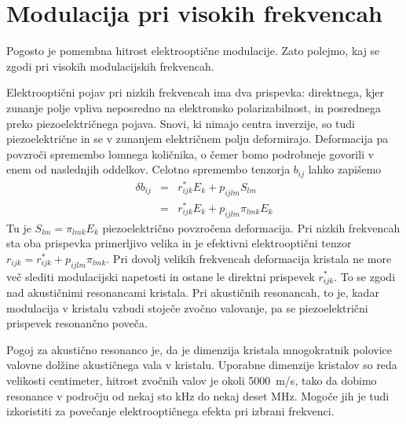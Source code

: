 \section{Modulacija pri visokih frekvencah}

Pogosto je pomembna hitrost elektrooptične modulacije. Zato polejmo,
kaj se zgodi pri visokih modulacijskih frekvencah.

Elektrooptični pojav pri nizkih frekvencah ima dva prispevka: direktnega,
kjer zunanje polje vpliva neposredno na elektronsko polarizabilnost,
in posrednega preko piezoelektričnega pojava. Snovi, ki nimajo centra
inverzije, so tudi piezoelektrične in se v zunanjem električnem polju
deformirajo. Deformacija pa povzroči spremembo lomnega količnika,
o čemer bomo podrobneje govorili v enem od naslednjih oddelkov. Celotno
spremembo tenzorja $b_{ij}$ lahko zapišemo 
\begin{eqnarray}
\delta b_{ij} & = & r_{ijk}^{\ast}E_{k}+p_{ijlm}S_{lm}\nonumber \\
 & = & r_{ijk}^{\ast}E_{k}+p_{ijlm}\pi_{lmk}E_{k}
\end{eqnarray}
 Tu je $S_{lm}=\pi_{lmk}E_{k}$ piezoelektrično povzročena deformacija.
Pri nizkih frekvencah sta oba prispevka primerljivo velika in je efektivni
elektrooptični tenzor $r_{ijk}=r_{ijk}^{\ast}+p_{ijlm}\pi_{lmk}$.
Pri dovolj velikih frekvencah deformacija kristala ne more več slediti
modulacijski napetosti in ostane le direktni prispevek $r_{ijk}^{\ast}$.
To se zgodi nad akustičnimi resonancami kristala. Pri akustičnih resonancah,
to je, kadar modulacija v kristalu vzbudi stoječe zvočno valovanje,
pa se piezoelektrični prispevek resonančno poveča.

Pogoj za akustično resonanco je, da je dimenzija kristala mnogokratnik
polovice valovne dolžine akustičnega vala v kristalu. Uporabne dimenzije
kristalov so reda velikosti centimeter, hitrost zvočnih valov je okoli
5000~m/s, tako da dobimo resonance v področju od nekaj sto kHz do
nekaj deset MHz. Mogoče jih je tudi izkoristiti za povečanje elektrooptičnega
efekta pri izbrani frekvenci.

